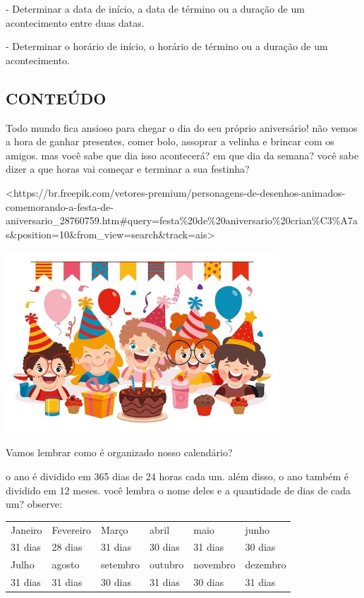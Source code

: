 - Determinar a data de início, a data de término ou a duração de um
acontecimento entre duas datas.

- Determinar o horário de início, o horário de término ou a duração de
um acontecimento.

\subsection{CONTEÚDO}\label{conteuxfado-3}

Todo mundo fica ansioso para chegar o dia do seu próprio aniversário!
não vemos a hora de ganhar presentes, comer bolo, assoprar a velinha e
brincar com os amigos. mas você sabe que dia isso acontecerá? em que dia
da semana? você sabe dizer a que horas vai começar e terminar a sua
festinha?

\textless{}https://br.freepik.com/vetores-premium/personagens-de-desenhos-animados-comemorando-a-festa-de-aniversario\_28760759.htm\#query=festa\%20de\%20aniversario\%20crian\%C3\%A7as\&position=10\&from\_view=search\&track=ais\textgreater{}

\includegraphics[width=4.02731in,height=2.68282in]{media/image34.jpg}

Vamos lembrar como é organizado nosso calendário?

o ano é dividido em 365 dias de 24 horas cada um. além disso, o ano
também é dividido em 12 meses. você lembra o nome deles e a quantidade
de dias de cada um? observe:

\begin{longtable}[]{@{}llllll@{}}
\toprule
Janeiro & Fevereiro & Março & abril & maio & junho\tabularnewline
31 dias & 28 dias & 31 dias & 30 dias & 31 dias & 30 dias\tabularnewline
Julho & agosto & setembro & outubro & novembro & dezembro\tabularnewline
31 dias & 31 dias & 30 dias & 31 dias & 30 dias & 31 dias\tabularnewline
\bottomrule
\end{longtable}

